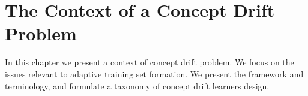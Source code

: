 \chapter{The Context of a Concept Drift Problem}
\label{cha:literature}

In this chapter we present a context of concept drift problem.
We focus on the issues relevant to adaptive training set formation.
We present the framework and terminology, and formulate a taxonomy of concept drift learners design.